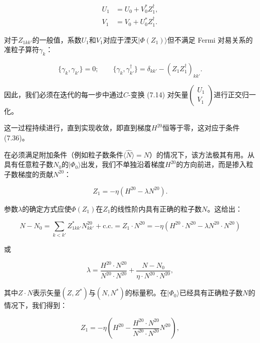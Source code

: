 \begin{align}
U_{1} & =U_{0}+V^{*}_{0}Z^{\dagger}_{1},\nonumber \\
V_{1} & =V_{0}+U^{*}_{0}Z^{\dagger}_{1}.\label{eq:u1_v1_thouless}
\end{align}

对于$Z_{1kk'}$的一般值，系数$U_{1}$和$V_{1}$对应于湮灭$|\Phi(Z_{1})\rangle$但不满足
Fermi 对易关系的准粒子算符$\gamma_{k}$：

\begin{equation}
\{\gamma_{k},\gamma_{k'}\}=0;\qquad\{\gamma_{k},\gamma^{\dagger}_{k'}\}=\delta_{kk'}-(Z_{1}Z^{\dagger}_{1})_{kk'}.\label{eq:gamma_anticommutation}
\end{equation}

因此，我们必须在迭代的每一步中通过$C$-变换 (7.14) 对矢量$\begin{pmatrix}U_{1}\\
V_{1}
\end{pmatrix}$进行正交归一化。

这一过程持续进行，直到实现收敛，即直到梯度$H^{20}$恒等于零，这对应于条件 (7.36)。

在必须满足附加条件（例如粒子数条件$\langle\hat{N}\rangle=N$）的情况下，该方法极其有用。从具有任意粒子数$N_{0}$的$|\Phi_{0}\rangle$出发，我们不单独沿着梯度$H^{20}$的方向前进，而是掺入粒子数梯度的贡献$N^{20}$：

\begin{equation}
Z_{1}=-\eta(H^{20}-\lambda N^{20}).\label{eq:gradient_with_particle_constraint}
\end{equation}

参数$\lambda$的确定方式应使$\Phi(Z_{1})$在$Z_{1}$的线性阶内具有正确的粒子数$N$。这给出：

\begin{equation}
N-N_{0}=\sum_{k<k'}Z^{*}_{1kk'}N^{20}_{kk'}+\text{c.c.}=Z_{1}\cdot N^{20}=-\eta(H^{20}\cdot N^{20}-\lambda N^{20}\cdot N^{20})\label{eq:particle_number_linear_order}
\end{equation}

或

\begin{equation}
\lambda=\frac{H^{20}\cdot N^{20}}{N^{20}\cdot N^{20}}+\frac{N-N_{0}}{\eta\cdot N^{20}\cdot N^{20}},\label{eq:lambda_determination}
\end{equation}

其中$Z\cdot N$表示矢量$(Z,Z^{*})$与$(N,N^{*})$的标量积。在$|\Phi_{0}\rangle$已经具有正确粒子数$N$的情况下，我们得到：

\begin{equation}
Z_{1}=-\eta\left(H^{20}-\frac{H^{20}\cdot N^{20}}{N^{20}\cdot N^{20}}N^{20}\right),\label{eq:projected_gradient}
\end{equation}

